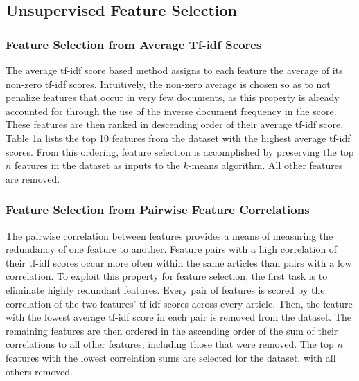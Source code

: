 \documentclass[11pt]{article}
\begin{document}
\subsection{Unsupervised Feature Selection}

\subsubsection{Feature Selection from Average Tf-idf Scores}

The average tf-idf score based method assigns to each feature the average of its non-zero tf-idf scores.
Intuitively, the non-zero average is chosen so as to not penalize features that occur in very few documents, as this property is already accounted for through the use of the inverse document frequency in the score.
These features are then ranked in descending order of their average tf-idf score.
Table 1a lists the top 10 features from the dataset with the highest average tf-idf scores.
From this ordering, feature selection is accomplished by preserving the top $n$ features in the dataset as inputs to the $k$-means algorithm.
All other features are removed.


\subsubsection{Feature Selection from Pairwise Feature Correlations}

The pairwise correlation between features provides a means of measuring the redundancy of one feature to another.
Feature pairs with a high correlation of their tf-idf scores occur more often within the same articles than pairs with a low correlation.
To exploit this property for feature selection, the first task is to eliminate highly redundant features.
Every pair of features is scored by the correlation of the two features' tf-idf scores across every article.
Then, the feature with the lowest average tf-idf score in each pair is removed from the dataset.
The remaining features are then ordered in the ascending order of the sum of their correlations to all other features, including those that were removed.
The top $n$ features with the lowest correlation sums are selected for the dataset, with all others removed.

\end{document}

